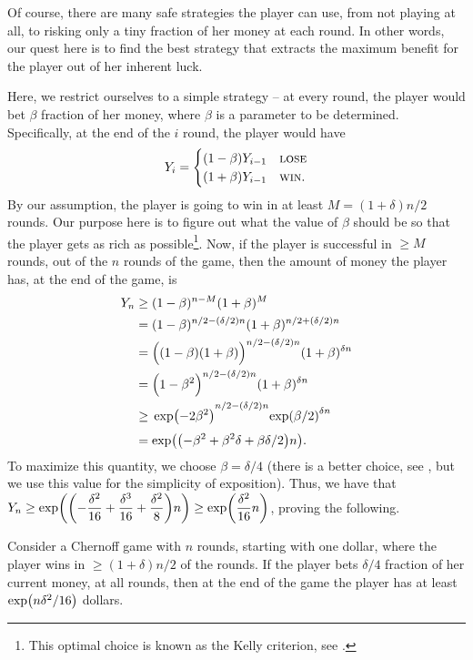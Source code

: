 Of course, there are many safe strategies the player can use, from not
playing at all, to risking only a tiny fraction of her money at each
round.  In other words, our quest here is to find the best strategy
that extracts the maximum benefit for the player out of her inherent
luck.

Here, we restrict ourselves to a simple strategy -- at every round,
the player would bet $\beta$ fraction of her money, where $\beta$ is a
parameter to be determined.  Specifically, at the end of the $i$\th
round, the player would have
\begin{align*}
    Y_{i} = \begin{cases}
        (1-\beta) Y_{i-1}  & \text{\textsc{lose}}\\
        (1+\beta) Y_{i-1} & \text{\textsc{win}}.
    \end{cases}
\end{align*}
By our assumption, the player is going to win in at least
$M=(1+\delta)n/2$ rounds.  Our purpose here is to figure out what the
value of $\beta$ should be so that the player gets as rich as
possible\footnote{This optimal choice is known as the Kelly criterion,
   see .}.  Now, if the player is successful in $\geq M$
rounds, out of the $n$ rounds of the game, then the amount of money
the player has, at the end of the game, is
\begin{align*}
    Y_n%
    &\geq%
    (1-\beta)^{n-M} (1+\beta)^M%
    \\&=%
    (1-\beta)^{n/2 -(\delta/2)n} (1+\beta)^{n/2 +(\delta/2)n}%
    \\&=%
    \pth[]{\Big. (1-\beta)(1+\beta)}^{n/2 -(\delta/2)n}
    (1+\beta)^{\delta n}%
    \\&%
    =%
    \pth[]{\Big. 1-\beta^2 }^{n/2 -(\delta/2)n} (1+\beta)^{\delta n}%
    \\&%
    \geq%
    {\Big. \exp\pth{ -2\beta^2} }^{n/2 -(\delta/2)n}
    {\exp\pth{\beta/2}}^{\delta n}%
    \\&%
    =%
    \exp\pth{ \pth[]{ -\beta^2 +\beta^2 \delta + \beta \delta /2 } n
    }.
\end{align*}
To maximize this quantity, we choose $\beta = \delta/4$ (there is a
better choice, see , but we use this value for the
simplicity of exposition).  Thus, we have that $\ds Y_n \geq \exp\pth{
   \pth[]{ -\frac{\delta^2}{16} + \frac{\delta^3}{16} +
      \frac{\delta^2}{8} } n } \geq \exp\pth{ \frac{\delta^2}{16} n
}$, proving the following.

\begin{lemma}%
    Consider a Chernoff game with $n$ rounds, starting with one
    dollar, where the player wins in $\geq (1+\delta)n/2$ of the
    rounds. If the player bets $\delta/4$ fraction of her current
    money, at all rounds, then at the end of the game the player has
    at least $\exp\pth{n \delta^2 / 16}$ dollars.
\end{lemma}


